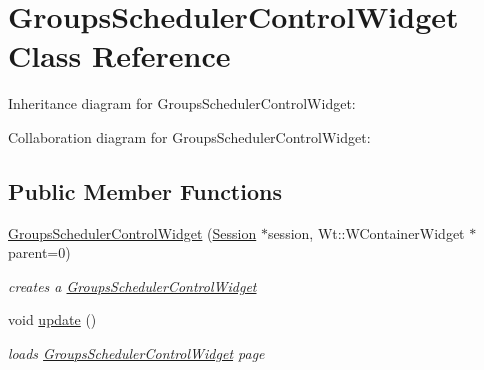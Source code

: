 \hypertarget{classGroupsSchedulerControlWidget}{}\section{Groups\+Scheduler\+Control\+Widget Class Reference}
\label{classGroupsSchedulerControlWidget}


Inheritance diagram for Groups\+Scheduler\+Control\+Widget\+:


Collaboration diagram for Groups\+Scheduler\+Control\+Widget\+:
\subsection*{Public Member Functions}
\begin{DoxyCompactItemize}
\item 
\hyperlink{classGroupsSchedulerControlWidget_a913ff60671d49cfe09aafe9f5f89e7f4}{Groups\+Scheduler\+Control\+Widget} (\hyperlink{classSession}{Session} $\ast$session, Wt\+::\+W\+Container\+Widget $\ast$parent=0)
\begin{DoxyCompactList}\small\item\em creates a \hyperlink{classGroupsSchedulerControlWidget}{Groups\+Scheduler\+Control\+Widget} \end{DoxyCompactList}\item 
void \hyperlink{classGroupsSchedulerControlWidget_afd0603c2ef11ccf5ac6a8812f0a6fd07}{update} ()
\begin{DoxyCompactList}\small\item\em loads \hyperlink{classGroupsSchedulerControlWidget}{Groups\+Scheduler\+Control\+Widget} page \end{DoxyCompactList}\end{DoxyCompactItemize}
